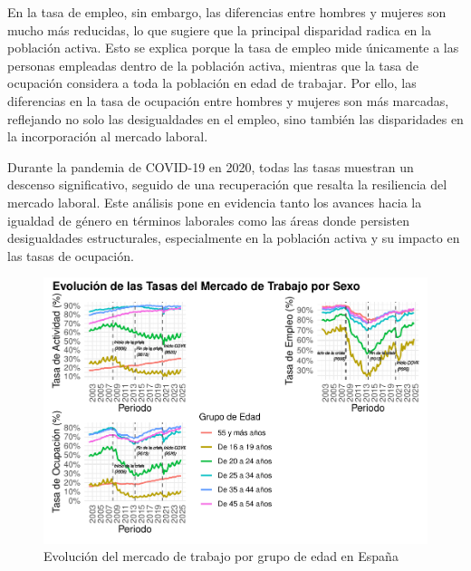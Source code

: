 \documentclass[Universitat de
València,article,submit,moreauthors,pdftex]{Definitions/mdpi}
\begin{document}
En la tasa de empleo, sin embargo, las diferencias entre hombres y
mujeres son mucho más reducidas, lo que sugiere que la principal
disparidad radica en la población activa. Esto se explica porque la tasa
de empleo mide únicamente a las personas empleadas dentro de la
población activa, mientras que la tasa de ocupación considera a toda la
población en edad de trabajar. Por ello, las diferencias en la tasa de
ocupación entre hombres y mujeres son más marcadas, reflejando no solo
las desigualdades en el empleo, sino también las disparidades en la
incorporación al mercado laboral.

Durante la pandemia de COVID-19 en 2020, todas las tasas muestran un
descenso significativo, seguido de una recuperación que resalta la
resiliencia del mercado laboral. Este análisis pone en evidencia tanto
los avances hacia la igualdad de género en términos laborales como las
áreas donde persisten desigualdades estructurales, especialmente en la
población activa y su impacto en las tasas de ocupación.

\begin{figure}[h]

{\centering \includegraphics[width=1\linewidth]{ProyectoAED2024_files/figure-latex/unnamed-chunk-30-1} 

}

\caption{Evolución del mercado de trabajo por grupo de edad en España}\label{fig:unnamed-chunk-30}
\end{figure}
\end{document}
